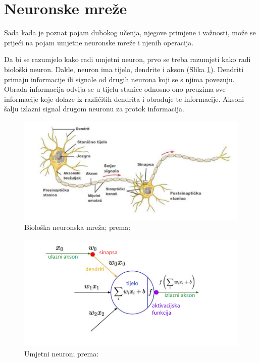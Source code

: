 \documentclass[]{foi} %
\begin{document}
\newpage
\section{Neuronske mreže}

Sada kada je poznat pojam dubokog učenja, njegove primjene i važnosti, može se prijeći na pojam umjetne neuronske mreže i njenih operacija.

Da bi se razumjelo kako radi umjetni neuron, prvo se treba razumjeti kako radi biološki neuron.
Dakle, neuron ima tijelo, dendrite i akson \cite{tds1} (Slika \ref{fig:bnn}). Dendriti primaju informacije ili signale od drugih neurona koji se s njima povezuju. Obrada informacija odvija se u tijelu stanice odnosno ono preuzima sve informacije koje dolaze iz različitih dendrita i obrađuje te informacije. Aksoni šalju izlazni signal drugom neuronu za protok informacija.

\begin{figure}[!ht]
    \centering
    \includegraphics[width=1\textwidth]{slike/bnn.png}
    \caption{Biološka neuronska mreža; prema: \cite{builtin1}}
    \label{fig:bnn}
\end{figure}

\begin{figure}[!ht]
    \centering
    \includegraphics[width=1\textwidth]{slike/neuron.png}
    \caption{Umjetni neuron; prema: \cite{principles}}
    \label{fig:neuron}
\end{figure}
\end{document}

